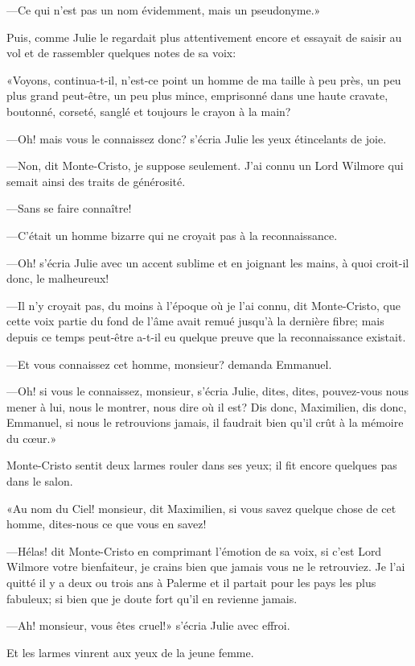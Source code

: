 —Ce qui n'est pas un nom évidemment, mais un pseudonyme.» 

Puis, comme Julie le regardait plus attentivement encore et essayait de saisir au vol et de rassembler quelques notes de sa voix: 

«Voyons, continua-t-il, n'est-ce point un homme de ma taille à peu près, un peu plus grand peut-être, un peu plus mince, emprisonné dans une haute cravate, boutonné, corseté, sanglé et toujours le crayon à la main? 

—Oh! mais vous le connaissez donc? s'écria Julie les yeux étincelants de joie. 

—Non, dit Monte-Cristo, je suppose seulement. J'ai connu un Lord Wilmore qui semait ainsi des traits de générosité. 

—Sans se faire connaître!  

—C'était un homme bizarre qui ne croyait pas à la reconnaissance. 

—Oh! s'écria Julie avec un accent sublime et en joignant les mains, à quoi croit-il donc, le malheureux! 

—Il n'y croyait pas, du moins à l'époque où je l'ai connu, dit Monte-Cristo, que cette voix partie du fond de l'âme avait remué jusqu'à la dernière fibre; mais depuis ce temps peut-être a-t-il eu quelque preuve que la reconnaissance existait. 

—Et vous connaissez cet homme, monsieur? demanda Emmanuel. 

—Oh! si vous le connaissez, monsieur, s'écria Julie, dites, dites, pouvez-vous nous mener à lui, nous le montrer, nous dire où il est? Dis donc, Maximilien, dis donc, Emmanuel, si nous le retrouvions jamais, il faudrait bien qu'il crût à la mémoire du cœur.» 

Monte-Cristo sentit deux larmes rouler dans ses yeux; il fit encore quelques pas dans le salon. 

«Au nom du Ciel! monsieur, dit Maximilien, si vous savez quelque chose de cet homme, dites-nous ce que vous en savez! 

—Hélas! dit Monte-Cristo en comprimant l'émotion de sa voix, si c'est Lord Wilmore votre bienfaiteur, je crains bien que jamais vous ne le retrouviez. Je l'ai quitté il y a deux ou trois ans à Palerme et il partait pour les pays les plus fabuleux; si bien que je doute fort qu'il en revienne jamais. 

—Ah! monsieur, vous êtes cruel!» s'écria Julie avec effroi. 

Et les larmes vinrent aux yeux de la jeune femme. 

